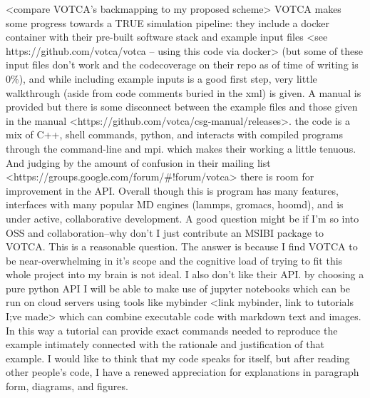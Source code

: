 <compare VOTCA's backmapping to my proposed scheme>
VOTCA makes some progress towards a TRUE simulation pipeline: they include a docker container with their pre-built software stack and example input files <see https://github.com/votca/votca -- using this code via docker> (but some of these input files don't work and the codecoverage on their repo as of time of writing is 0\%), and while including example inputs is a good first step, very little walkthrough (aside from code comments buried in the xml) is given.
A manual is provided but there is some disconnect between the example files and those given in the manual <https://github.com/votca/csg-manual/releases>.
the code is a mix of C++, shell commands, python, and interacts with compiled programs through the command-line and mpi.
which makes their working a little tenuous.
And judging by the amount of confusion in their mailing list <https://groups.google.com/forum/\#!forum/votca> there is room for improvement in the API.
Overall though this is program has many features, interfaces with many popular MD engines (lammps, gromacs, hoomd), and is under active, collaborative development.
A good question might be if I'm so into OSS and collaboration--why don't I just contribute an MSIBI package to VOTCA.
This is a reasonable question.
The answer is because I find VOTCA to be near-overwhelming in it's scope and the cognitive load of trying to fit this whole project into my brain is not ideal.
I also don't like their API.
by choosing a pure python API I will be able to make use of jupyter notebooks which can be run on cloud servers using tools like mybinder <link mybinder, link to tutorials I;ve made> which can combine executable code with markdown text and images.
In this way a tutorial can provide exact commands needed to reproduce the example intimately connected with the rationale and justification of that example.
I would like to think that my code speaks for itself, but after reading other people's code, I have a renewed appreciation for explanations in paragraph form, diagrams, and figures.

